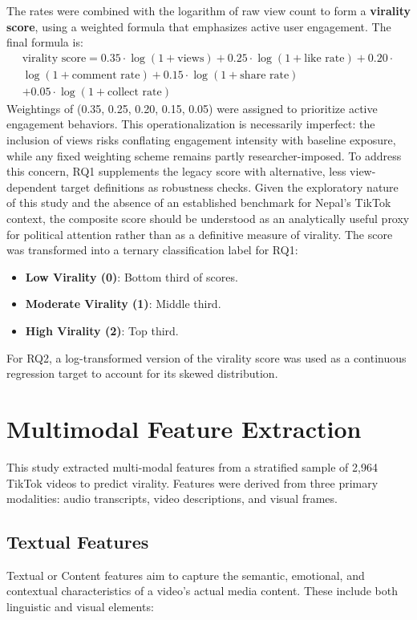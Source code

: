 \documentclass[12pt,a4paper]{report}
\begin{document}
The rates were combined with the logarithm of raw view count to form a \textbf{virality score}, using a weighted formula that emphasizes active user engagement. The final formula is:
\begin{multline}
\text{virality score} = 0.35 \cdot \log(1 + \text{views}) + 0.25 \cdot \log(1 + \text{like rate}) + 0.20 \cdot \\ \log(1 + \text{comment rate}) + 0.15 \cdot \log(1 + \text{share rate}) \\ + 0.05 \cdot \log(1 + \text{collect rate})
\end{multline}
Weightings of (0.35, 0.25, 0.20, 0.15, 0.05) were assigned to prioritize active engagement behaviors. This operationalization is necessarily imperfect: the inclusion of views risks conflating engagement intensity with baseline exposure, while any fixed weighting scheme remains partly researcher-imposed. To address this concern, RQ1 supplements the legacy score with alternative, less view-dependent target definitions as robustness checks. Given the exploratory nature of this study and the absence of an established benchmark for Nepal’s TikTok context, the composite score should be understood as an analytically useful proxy for political attention rather than as a definitive measure of virality.
The score was transformed into a ternary classification label for RQ1:
\begin{itemize}
    \item \textbf{Low Virality (0)}: Bottom third of scores.
    \item \textbf{Moderate Virality (1)}: Middle third.
    \item \textbf{High Virality (2)}: Top third.
\end{itemize}
For RQ2, a log-transformed version of the virality score was used as a continuous regression target to account for its skewed distribution.
\newpage
\section{Multimodal Feature Extraction}

This study extracted multi-modal features from a stratified sample of 2,964 TikTok videos to predict virality. Features were derived from three primary modalities: audio transcripts, video descriptions, and visual frames.

\subsection{Textual Features}
Textual or Content features aim to capture the semantic, emotional, and contextual characteristics of a video’s actual media content. These include both linguistic and visual elements:
\end{document}
